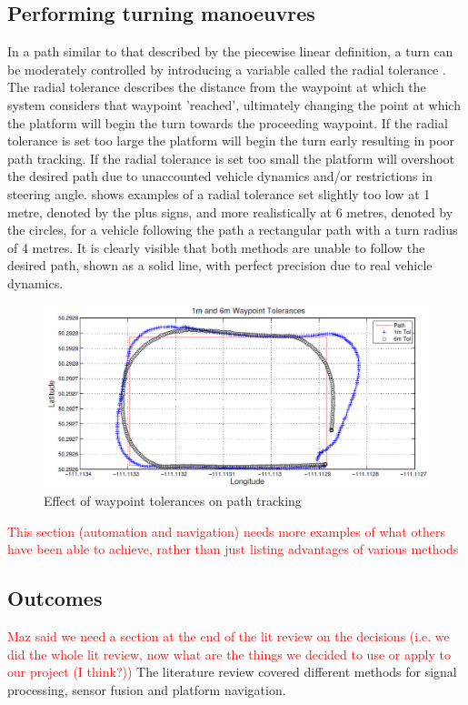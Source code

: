 \documentclass[main.tex]{subfiles}
\begin{document}
\subsection{Performing turning manoeuvres}
In a path similar to that described by the piecewise linear definition, a turn can be moderately controlled by introducing a variable called the radial tolerance \parencite{Giesbrecht2005}. The radial tolerance describes the distance from the waypoint at which the system considers that waypoint 'reached', ultimately changing the point at which the platform will begin the turn towards the proceeding waypoint. If the radial tolerance is set too large the platform will begin the turn early resulting in poor path tracking. If the radial tolerance is set too small the platform will overshoot the desired path due to unaccounted vehicle dynamics and/or restrictions in steering angle.  shows examples of a radial tolerance set slightly too low at 1 metre, denoted by the plus signs, and more realistically at 6 metres, denoted by the circles, for a vehicle following the path a rectangular path with a turn radius of 4 metres. It is clearly visible that both methods are unable to follow the desired path, shown as a solid line, with perfect precision due to real vehicle dynamics.
\begin{figure}[ht]
\includegraphics[width=\textwidth]{2-LiteratureReview/waypointTolerances.PNG}
\centering
\caption[Effect of waypoint tolerances on path tracking]{Effect of waypoint tolerances on path tracking \parencite{Giesbrecht2005}} 
\end{figure}

\textcolor{red}{This section (automation and navigation) needs more examples of what others have been able to achieve, rather than just listing advantages of various methods}
\subsection{Outcomes}
\textcolor{red}{Maz said we need a section at the end of the lit review on the decisions (i.e. we did the whole lit review, now what are the things we decided to use or apply to our project (I think?))}
The literature review covered different methods for signal processing, sensor fusion and platform navigation.
\end{document}
